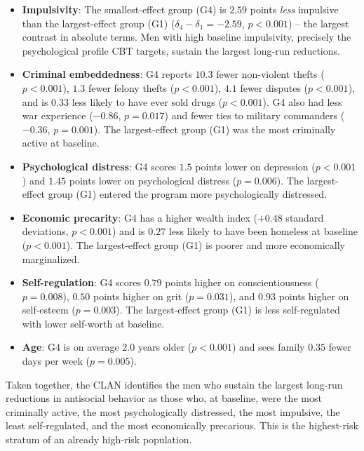 \documentclass[11pt]{article}
\begin{document}
\begin{itemize}
\item \textbf{Impulsivity}: The smallest-effect group (G4) is $2.59$ points \emph{less} impulsive than the largest-effect group (G1) ($\delta_4 - \delta_1 = -2.59$, $p < 0.001$) -- the largest contrast in absolute terms. Men with high baseline impulsivity, precisely the psychological profile CBT targets, sustain the largest long-run reductions.

\item \textbf{Criminal embeddedness}: G4 reports $10.3$ fewer non-violent thefts ($p < 0.001$), $1.3$ fewer felony thefts ($p < 0.001$), $4.1$ fewer disputes ($p < 0.001$), and is $0.33$ less likely to have ever sold drugs ($p < 0.001$). G4 also had less war experience ($-0.86$, $p = 0.017$) and fewer ties to military commanders ($-0.36$, $p = 0.001$). The largest-effect group (G1) was the most criminally active at baseline.

\item \textbf{Psychological distress}: G4 scores $1.5$ points lower on depression ($p < 0.001$) and $1.45$ points lower on psychological distress ($p = 0.006$). The largest-effect group (G1) entered the program more psychologically distressed.

\item \textbf{Economic precarity}: G4 has a higher wealth index ($+0.48$ standard deviations, $p < 0.001$) and is $0.27$ less likely to have been homeless at baseline ($p < 0.001$). The largest-effect group (G1) is poorer and more economically marginalized.

\item \textbf{Self-regulation}: G4 scores $0.79$ points higher on conscientiousness ($p = 0.008$), $0.50$ points higher on grit ($p = 0.031$), and $0.93$ points higher on self-esteem ($p = 0.003$). The largest-effect group (G1) is less self-regulated with lower self-worth at baseline.

\item \textbf{Age}: G4 is on average $2.0$ years older ($p < 0.001$) and sees family $0.35$ fewer days per week ($p = 0.005$).
\end{itemize}

Taken together, the CLAN identifies the men who sustain the largest long-run reductions in antisocial behavior as those who, at baseline, were the most criminally active, the most psychologically distressed, the most impulsive, the least self-regulated, and the most economically precarious. This is the highest-risk stratum of an already high-risk population.
\end{document}
